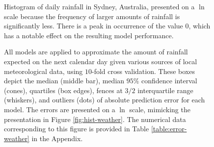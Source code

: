 \begin{figure}
  \centering
  \caption{Histogram of daily rainfall in Sydney, Australia, presented
    on a $\ln$ scale because the frequency of larger amounts of
    rainfall is significantly less. There is a peak in occurrence of
    the value $0$, which has a notable effect on the resulting model
    performance.}
  \label{fig:hist-weather}

  \vspace{.3cm}

  \caption{All models are applied to approximate the amount of
    rainfall expected on the next calendar day given various sources
    of local meteorological data, using $10$-fold cross validation.
    These boxes depict the median (middle bar), median $95\%$
    confidence interval (cones), quartiles (box edges), fences at
    $3/2$ interquartile range (whiskers), and outliers (dots) of
    absolute prediction error for each model. The errors are presented
    on a $\ln$ scale, mimicking the presentation in Figure
    \ref{fig:hist-weather}. The numerical data corresponding to this
    figure is provided in Table \ref{table:error-weather} in the
    Appendix.}
  \label{fig:error-weather}
\end{figure}

